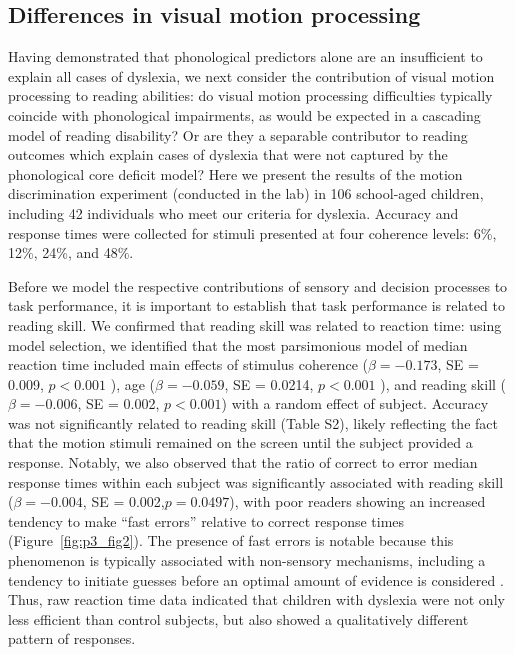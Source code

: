 \documentclass[../uwthesis.tex]{subfiles}
\begin{document}
\subsection{Differences in visual motion processing}
Having demonstrated that phonological predictors alone are an insufficient to explain all cases of dyslexia, we next consider the contribution of visual motion processing to reading abilities: do visual motion processing difficulties typically coincide with phonological impairments, as would be expected in a cascading model of reading disability? Or are they a separable contributor to reading outcomes which explain cases of dyslexia that were not captured by the phonological core deficit model? Here we present the results of the motion discrimination experiment (conducted in the lab) in 106 school-aged children, including 42 individuals who meet our criteria for dyslexia. Accuracy and response times were collected for stimuli presented at four coherence levels: 6\%, 12\%, 24\%, and 48\%.

Before we model the respective contributions of sensory and decision processes to task
performance, it is important to establish that task performance is related to reading skill. We confirmed that reading skill was related to reaction time: using model selection, we identified that the most parsimonious model of median reaction time included main effects of stimulus coherence ($\beta = -0.173$, SE = 0.009, $p < 0.001$ ), age ($\beta = -0.059$, SE = 0.0214, $p<0.001$ ), and reading skill ($\beta= -0.006$, SE = 0.002, $p<0.001$) with a random effect of subject. Accuracy was not significantly related to reading skill (Table S2), likely reflecting the fact that the motion stimuli remained on the screen until the subject provided a response. Notably, we also observed that the ratio of correct to error median response times within each subject was significantly associated with reading skill ($\beta = -0.004$, SE = 0.002,$p = 0.0497$), with poor readers showing an increased tendency to make “fast errors” relative to correct response times (Figure~\ref{fig:p3_fig2}). The presence of fast errors is notable because this phenomenon is typically associated with non-sensory mechanisms, including a tendency to initiate guesses before an optimal amount of evidence is considered \cite{Smith2004PsychologyDecisions}. Thus, raw reaction time data indicated that children with dyslexia were not only less efficient than control subjects, but also showed a qualitatively different pattern of responses.
\end{document}
